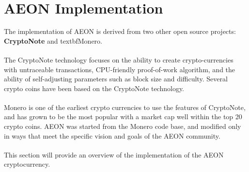 \section{AEON Implementation}
\label{secImp}

The implementation of AEON is derived from two other open source projects:  \textbf{CryptoNote} and textbf{Monero}.\\
\\
The CryptoNote technology focuses on the ability to create crypto-currencies with untraceable transactions, CPU-friendly proof-of-work algorithm, and the ability of self-adjusting parameters such as block size and difficulty. Several crypto coins have been based on the CryptoNote technology.\\
\\
Monero is one of the earliest crypto currencies to use the features of CryptoNote, and has grown to be the most popular with a market cap well within the top 20 crypto coins.  AEON was started from the Monero code base, and modified only in ways that meet the specific vision and goals of the AEON community.\\
\\
This section will provide an overview of the implementation of the AEON cryptocurrency.

